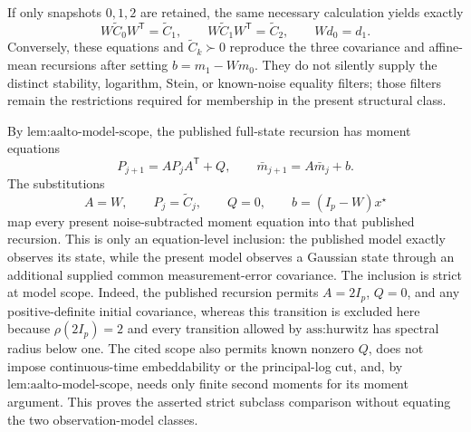 If only snapshots \(0,1,2\) are retained, the same necessary calculation yields exactly
\[
 W\widetilde C_0W^{\mathsf T}=\widetilde C_1,
 \qquad
 W\widetilde C_1W^{\mathsf T}=\widetilde C_2,
 \qquad
 Wd_0=d_1.
\]
Conversely, these equations and \(\widetilde C_k\succ0\) reproduce the three covariance and affine-mean recursions after setting \(b=m_1-Wm_0\).  They do not silently supply the distinct stability, logarithm, Stein, or known-noise equality filters; those filters remain the restrictions required for membership in the present structural class.

By \(\text{lem:aalto-model-scope}\), the published full-state recursion has moment equations
\[
 P_{j+1}=AP_jA^{\mathsf T}+Q,
 \qquad
 \bar m_{j+1}=A\bar m_j+b.
\]
The substitutions
\[
 A=W,
 \qquad
 P_j=\widetilde C_j,
 \qquad
 Q=0,
 \qquad
 b=(I_p-W)x^\star
\]
map every present noise-subtracted moment equation into that published recursion.  This is only an equation-level inclusion: the published model exactly observes its state, while the present model observes a Gaussian state through an additional supplied common measurement-error covariance.  The inclusion is strict at model scope.  Indeed, the published recursion permits \(A=2I_p\), \(Q=0\), and any positive-definite initial covariance, whereas this transition is excluded here because \(\rho(2I_p)=2\) and every transition allowed by \(\text{ass:hurwitz}\) has spectral radius below one.  The cited scope also permits known nonzero \(Q\), does not impose continuous-time embeddability or the principal-log cut, and, by \(\text{lem:aalto-model-scope}\), needs only finite second moments for its moment argument.  This proves the asserted strict subclass comparison without equating the two observation-model classes.

